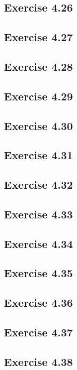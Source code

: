 \documentclass[../Chapter.tex]{subfiles}
\begin{document}
\subsection*{Exercise 4.26}

\subsection*{Exercise 4.27}

\subsection*{Exercise 4.28}

\subsection*{Exercise 4.29}

\subsection*{Exercise 4.30}

\subsection*{Exercise 4.31}

\subsection*{Exercise 4.32}

\subsection*{Exercise 4.33}

\subsection*{Exercise 4.34}

\subsection*{Exercise 4.35}

\subsection*{Exercise 4.36}

\subsection*{Exercise 4.37}

\subsection*{Exercise 4.38}
\phantom{}
\end{document}
